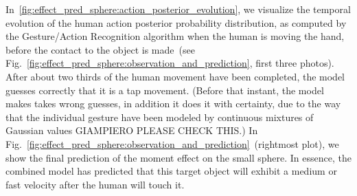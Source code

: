 \begin{figure*}
    \centering


    \caption{Object velocity predictions on a small sphere, given probabilistic human action information from Gesture \acp{HMM}.}
    \label{fig:effect_pred_sphere}
\end{figure*}

In~\ref{fig:effect_pred_sphere:action_posterior_evolution}, we visualize the temporal evolution of the human action posterior probability distribution, as computed by the Gesture/Action Recognition algorithm when the human is moving the hand, before the contact to the object is made~(see Fig.~\ref{fig:effect_pred_sphere:observation_and_prediction}, first three photos).
After about two thirds of the human movement have been completed, the model guesses correctly that it is a tap movement.
(Before that instant, the model makes takes wrong guesses, in addition it does it with certainty, due to the way that the individual gesture have been modeled by continuous mixtures of Gaussian values GIAMPIERO PLEASE CHECK THIS.)
In Fig.~\ref{fig:effect_pred_sphere:observation_and_prediction}~(rightmost plot), we show the final prediction of the moment effect on the small sphere.
In essence, the combined model has predicted that this target object will exhibit a medium or fast velocity after the human will touch it.

